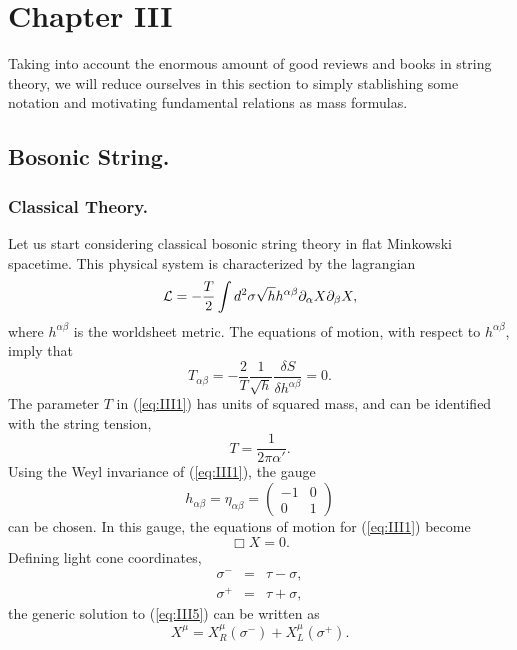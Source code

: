 \section{Chapter III}

Taking into account the enormous amount of good reviews and books
\cite{GSW,Vafa,Polchinski,Kiri} in string theory, we will reduce ourselves in this section to
simply stablishing some notation and motivating fundamental
relations as mass formulas.


\subsection{Bosonic String.}
\label{sec:III1}

\subsubsection{Classical Theory.}

Let us start considering classical bosonic string theory in flat
Minkowski spacetime. This physical system is characterized by the
lagrangian
\begin{equation}
{\cal L} = - \frac {T}{2} \int d^2 \sigma \sqrt{h} h^{\alpha
\beta} \partial_{\alpha} X \partial_{\beta} X,
\label{eq:III1}
\end{equation}
where $h^{\alpha \beta}$ is the worldsheet metric. The equations
of motion, with respect to $h^{\alpha \beta}$, imply that
\begin{equation}
T_{\alpha \beta} = - \frac {2}{T} \frac {1}{\sqrt{h}} \frac
{\delta S}{\delta h^{\alpha \beta}}=0.
\label{eq:III2}
\end{equation}
The parameter $T$ in (\ref{eq:III1}) has units of squared mass,
and can be identified with the string tension,
\begin{equation}
T= \frac {1}{2 \pi \alpha'}.
\label{eq:III3}
\end{equation}
Using the Weyl invariance of (\ref{eq:III1}), the gauge 
\begin{equation}
h_{\alpha \beta} = \eta_{\alpha \beta} = \left(
\begin{array}{cc} -1 & 0 \\ 0 & 1 \end{array} \right)
\label{eq:III4}
\end{equation}
can be chosen. In this gauge, the equations of motion for
(\ref{eq:III1}) become
\begin{equation}
\Box X = 0.
\label{eq:III5}
\end{equation}
Defining light cone coordinates,
\begin{eqnarray}
\sigma^- & = & \tau - \sigma, \nonumber \\
\sigma^+ & = & \tau + \sigma, 
\label{eq:III6}
\end{eqnarray}
the generic solution to (\ref{eq:III5}) can be written as
\begin{equation}
X^{\mu} = X_R^{\mu}(\sigma^-) + X_L^{\mu}(\sigma^+).
\label{eq:III7}
\end{equation}
  
